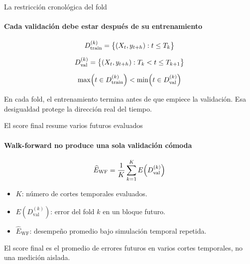 \documentclass[aspectratio=169,11pt]{beamer}  %
\begin{document}

\begin{frame}{La restricción cronológica del fold}
\framesubtitle{Cada validación debe estar después de su entrenamiento}
\Large
\begin{gather*}
D^{(k)}_{\mathrm{train}} = \bigl\{(X_t, y_{t+h}) : t \le T_k\bigr\}\\[0.6em]
D^{(k)}_{\mathrm{val}} = \bigl\{(X_t, y_{t+h}) : T_k < t \le T_{k+1}\bigr\}\\[0.6em]
\max\Bigl(t \in D^{(k)}_{\mathrm{train}}\Bigr) < \min\Bigl(t \in D^{(k)}_{\mathrm{val}}\Bigr)
\end{gather*}
\normalsize
\begin{center}
En cada fold, el entrenamiento termina antes de que empiece la validación. Esa desigualdad protege la dirección real del tiempo.
\end{center}
\end{frame}

\begin{frame}{El score final resume varios futuros evaluados}
\framesubtitle{Walk-forward no produce una sola validación cómoda}
{\Large\[ \widehat{E}_{\mathrm{WF}} = \frac{1}{K}\sum_{k=1}^{K} E\Bigl(D^{(k)}_{\mathrm{val}}\Bigr) \]}
\begin{itemize}
\item $K$: número de cortes temporales evaluados.
\item $E(D^{(k)}_{\mathrm{val}})$: error del fold $k$ en un bloque futuro.
\item $\widehat{E}_{\mathrm{WF}}$: desempeño promedio bajo simulación temporal repetida.
\end{itemize}
\begin{center}
El score final es el promedio de errores futuros en varios cortes temporales, no una medición aislada.
\end{center}
\end{frame}
\end{document}
